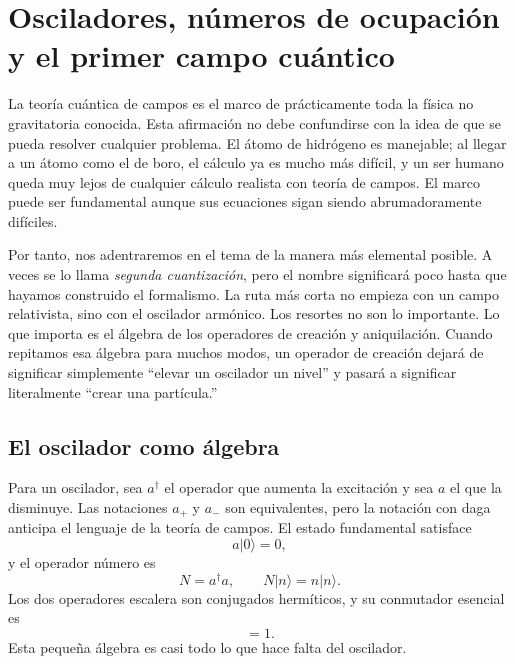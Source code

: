 \chapter{Osciladores, números de ocupación y el primer campo cuántico}

La teoría cuántica de campos es el marco de prácticamente toda la física no gravitatoria conocida. Esta afirmación no debe confundirse con la idea de que se pueda resolver cualquier problema. El átomo de hidrógeno es manejable; al llegar a un átomo como el de boro, el cálculo ya es mucho más difícil, y un ser humano queda muy lejos de cualquier cálculo realista con teoría de campos. El marco puede ser fundamental aunque sus ecuaciones sigan siendo abrumadoramente difíciles.

Por tanto, nos adentraremos en el tema de la manera más elemental posible. A veces se lo llama \emph{segunda cuantización}, pero el nombre significará poco hasta que hayamos construido el formalismo. La ruta más corta no empieza con un campo relativista, sino con el oscilador armónico. Los resortes no son lo importante. Lo que importa es el álgebra de los operadores de creación y aniquilación. Cuando repitamos esa álgebra para muchos modos, un operador de creación dejará de significar simplemente ``elevar un oscilador un nivel'' y pasará a significar literalmente ``crear una partícula.''

\section{El oscilador como álgebra}

Para un oscilador, sea \(a^\dagger\) el operador que aumenta la excitación y sea \(a\) el que la disminuye. Las notaciones \(a_+\) y \(a_-\) son equivalentes, pero la notación con daga anticipa el lenguaje de la teoría de campos. El estado fundamental satisface
\begin{equation}
a|0\rangle=0,
\end{equation}
y el operador número es
\begin{equation}
N=a^\dagger a,
\qquad
N|n\rangle=n|n\rangle.
\end{equation}
Los dos operadores escalera son conjugados hermíticos, y su conmutador esencial es
\begin{equation}
[a,a^\dagger]=1.
\label{eq:l06-single-commutator}
\end{equation}
Esta pequeña álgebra es casi todo lo que hace falta del oscilador.

